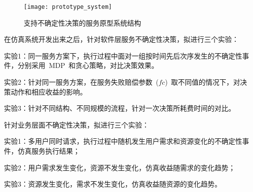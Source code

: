 \begin{figure}[htbp]
    \centering
    \texttt{[image: prototype\_system]}
    \caption{支持不确定性决策的服务原型系统结构}\label{figure:prototype_system}
    \vspace{-1em}
\end{figure}


在仿真系统开发出来之后，针对软件层服务不确定性决策，拟进行三个实验：

实验1：同一服务方案下，执行过程中面对一组按时间先后次序发生的不确定性事件，分别采用~MDP~和贪心策略，对比决策效果。

实验2：针对同一服务方案，在服务失败赔偿参数~($fc$)~取不同值的情况下，对决策动作和相应收益的影响。

实验3：针对不同结构、不同规模的流程，针对一次决策所耗费时间的对比。

针对业务层面不确定性决策，拟进行三个实验：

实验1：多用户同时请求，执行过程中随机发生用户需求和资源变化的不确定性事件，仿真服务执行结果；

实验2：用户需求发生变化，资源不发生变化，仿真收益随需求的变化趋势；

实验3：资源发生变化，需求不发生变化，仿真收益随资源的变化趋势。

